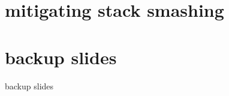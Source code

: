 \graphicspath{{./figures/}}
\date{}

\begin{frame}
    \titlepage
\end{frame}



\usetikzlibrary{arrows.meta,calc,matrix,positioning}
\section{mitigating stack smashing}













\section{backup slides}
\begin{frame}{backup slides}
\end{frame}



